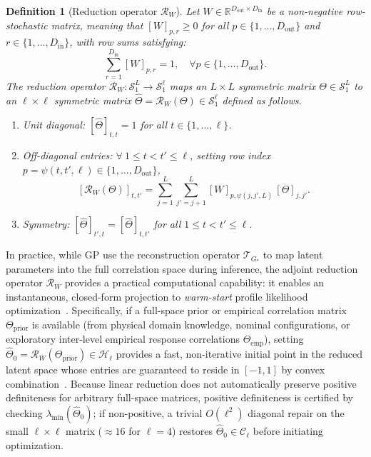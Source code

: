 \documentclass[default,sn-mathphys,Numbered]{sn-jnl}
\theoremstyle{thmstyleone}
\theoremstyle{thmstylethree}
\newtheorem{definition}{Definition}
\theoremstyle{thmstyletwo}
\newcommand{\inp}{\text{in}}
\newcommand{\outp}{\text{out}}
\begin{document}
\begin{definition}[Reduction operator $\mathcal{R}_W$]
\label{def:reduction_op}
Let $W \in \mathbb{R}^{D_{\outp} \times D_{\inp}}$ be a non-negative row-stochastic matrix, meaning that $[W]_{p, r} \ge 0$ for all $p \in \{1, \ldots, D_{\outp}\}$ and $r \in \{1, \ldots, D_{\inp}\}$, with row sums satisfying:
\begin{equation}
\label{eq:row_stochastic}
\sum_{r=1}^{D_{\inp}} [W]_{p, r} = 1, \quad \forall p \in \{1, \ldots, D_{\outp}\}.
\end{equation}
The reduction operator $\mathcal{R}_W : \mathcal{S}_1^L \to \mathcal{S}_1^\ell$ maps an $L \times L$ symmetric matrix $\Theta \in \mathcal{S}_1^L$ to an $\ell \times \ell$ symmetric matrix $\hat{\Theta} = \mathcal{R}_W(\Theta) \in \mathcal{S}_1^\ell$ defined as follows.
\begin{enumerate}
    \item Unit diagonal: $[\hat{\Theta}]_{t, t} = 1$ for all $t \in \{1, \ldots, \ell\}$.
    \item Off-diagonal entries:  $ \forall \  1 \le t < t' \le \ell$, setting row index $p = \psi(t, t', \ell) \in \{1, \ldots, D_{\outp}\}$,
    \begin{equation}
    \label{eq:reduc_formula}
    [\mathcal{R}_W(\Theta)]_{t, t'} = \sum_{j=1}^L \sum_{j'=j+1}^L [W]_{p, \psi(j,j',L)} \, [\Theta]_{j, j'}.
    \end{equation}
    \item Symmetry: $[\hat{\Theta}]_{t', t} = [\hat{\Theta}]_{t, t'}$ for all $1 \le t < t' \le \ell$.
\end{enumerate}
\end{definition}
In practice, while GP use the reconstruction operator $\mathcal{T}_{G_*}$ to map latent parameters into the full correlation space during inference, the adjoint reduction operator $\mathcal{R}_W$ provides a practical computational capability: it enables an instantaneous, closed-form projection to \textit{warm-start} profile likelihood optimization~\citep{saves2023high}.
Specifically, if a full-space prior or empirical correlation matrix $\Theta_{\mathrm{prior}}$ is available (from physical domain knowledge, nominal configurations, or exploratory inter-level empirical response correlations $\Theta_{\mathrm{emp}}$), setting $\hat{\Theta}_0 = \mathcal{R}_W(\Theta_{\mathrm{prior}}) \in \mathcal{H}_\ell$ provides a fast, non-iterative initial point in the reduced latent space whose entries are guaranteed to reside in $[-1, 1]$ by convex combination~\citep{Abramson2002,van2024reference}. Because linear reduction does not automatically preserve positive definiteness for arbitrary full-space matrices, positive definiteness is certified by checking $\lambda_{\min}(\hat{\Theta}_0)$; if non-positive, a trivial $O(\ell^2)$ diagonal repair on the small $\ell \times \ell$ matrix ($\approx 16$ for $\ell=4$) restores $\hat{\Theta}_0 \in \mathcal{C}_\ell$ before initiating optimization. 
\end{document}
